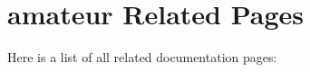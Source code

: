\section{amateur Related Pages}
Here is a list of all related documentation pages:\begin{CompactList}
\item {}

\end{CompactList}
